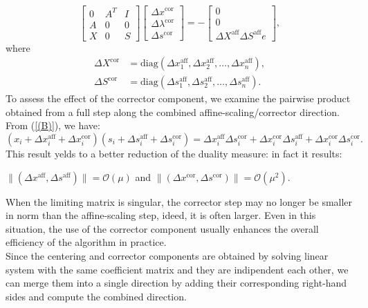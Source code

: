 \documentclass[a4paper,10 pt,titlepage,twoside]{book}
\theoremstyle{plain}
\theoremstyle{definition}
\theoremstyle{remark}
\begin{document}
\begin{equation}\label{(B)}
\begin{bmatrix}
0&A^{T}&I \\A&0&0\\X&0&S
\end{bmatrix}\begin{bmatrix}
\Delta x^{\text{cor}}\\\Delta\lambda^{\text{cor}} \\\Delta s^{\text{cor}}
\end{bmatrix}=-\begin{bmatrix}
0\\0\\\Delta X^{\text{aff}}\Delta S^{\text{aff}}e
\end{bmatrix},
\end{equation}
where
\begin{align*}
\Delta X^{\text{cor}}& = \text{diag}(\Delta x_{1}^{\text{aff}}, \Delta x_{2}^{\text{aff}},\dots,\Delta x_{n}^{\text{aff}}),\\
\Delta S^{\text{cor}}& = \text{diag}(\Delta s_{1}^{\text{aff}}, \Delta s_{2}^{\text{aff}},\dots,\Delta s_{n}^{\text{aff}}).
\end{align*}
To assess the effect of the corrector component, we examine the pairwise product obtained from a full step along the combined affine-scaling/corrector direction. From (\ref{(B)}), we have:
\begin{equation*}
(x_{i}+\Delta x_{i}^{\text{aff}}+\Delta x_{i}^{\text{cor}})(s_{i}+\Delta s_{i}^{\text{aff}}+\Delta s_{i}^{\text{cor}})= \Delta x_{i}^{\text{aff}}\Delta s_{i}^{\text{cor}}+\Delta x_{i}^{\text{cor}}\Delta s_{i}^{\text{aff}}+\Delta x_{i}^{\text{cor}}\Delta s_{i}^{\text{cor}}.
\end{equation*}
This result yelds to a better reduction of the duality measure: in fact it results:
\begin{center} 
$\lVert(\Delta x^{\text{aff}},\Delta s^{\text{aff}}) \rVert = \mathcal{O}(\mu)$ and $\lVert(\Delta x^{\text{cor}},\Delta s^{\text{cor}}) \rVert = \mathcal{O}(\mu^{2})$.
\end{center}
When the limiting matrix is singular, the corrector step may no longer be smaller in norm than the affine-scaling step, ideed, it is often larger. Even in this situation, the use of the corrector component usually enhances the overall efficiency of the algorithm in practice.\\
Since the centering and corrector components are obtained by solving linear system with the same coefficient matrix and they are indipendent each other, we can merge them into a single direction by adding their corresponding right-hand sides and compute the combined direction. 
\end{document}
